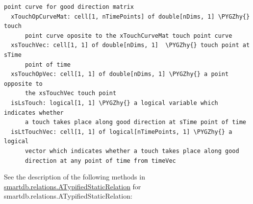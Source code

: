 \documentclass[letterpaper,10pt,english]{sphinxmanual}
\def\PYGZhy{\char`\-}
\begin{document}
\begin{Verbatim}[commandchars=\\\{\}]
      point curve for good direction matrix
  xTouchOpCurveMat: cell[1, nTimePoints] of double[nDims, 1] \PYGZhy{} touch
      point curve oposite to the xTouchCurveMat touch point curve
  xsTouchVec: cell[1, 1] of double[nDims, 1]  \PYGZhy{} touch point at sTime
      point of time
  xsTouchOpVec: cell[1, 1] of double[nDims, 1] \PYGZhy{} a point opposite to
      the xsTouchVec touch point
  isLsTouch: logical[1, 1] \PYGZhy{} a logical variable which indicates whether
      a touch takes place along good direction at sTime point of time
  isLtTouchVec: cell[1, 1] of logical[nTimePoints, 1] \PYGZhy{} a logical
      vector which indicates whether a touch takes place along good
      direction at any point of time from timeVec
\end{Verbatim}

See the description of the following methods in {\hyperref[chap_functions:smartdb-relations-atypifiedstaticrelation]{smartdb.relations.ATypifiedStaticRelation}} for smartdb.relations.ATypifiedStaticRelation:
\end{document}
